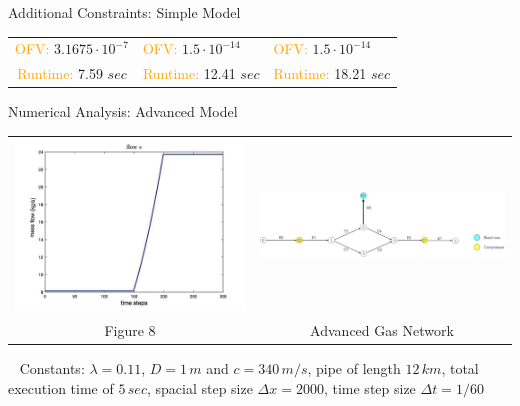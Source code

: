 \documentclass[8pt]{beamer}
\newcommand\Fontli{\fontsize{7}{7.2}\selectfont}
\begin{document}
\begin{frame}{Additional Constraints: Simple Model}
\begin{tabular}{c p{3cm} p{3cm}}
\textcolor{orange}{OFV:} $3.1675 \cdot 10^{-7}$ & \textcolor{orange}{OFV:}  $1.5 \cdot 10^{-14}$  & \textcolor{orange}{OFV:}  $1.5 \cdot 10^{-14}$ \\ 
\textcolor{orange}{Runtime:} 7.59 $sec$ & \textcolor{orange}{Runtime:}  12.41 $sec$  & \textcolor{orange}{Runtime:}  18.21 $sec$ \\
\end{tabular}
\end{frame}

\begin{frame}{Numerical Analysis: Advanced Model}
\Fontli
\begin{tabular}{cc}
  \includegraphics[height=0.4\textheight]{images/eps_advanced_new.jpg}& 
  \includegraphics[height=0.18\textheight]{images/AdvancedNetwork} 
   \\                                                     
\textcolor{bluepurp}{Figure 8} & Advanced Gas Network 
 \end{tabular}
 \ \newline\newline
\textcolor{bluepurp}{Constants:} $\lambda = 0.11$, $D=1 \, m$ and $c = 340 \, m/s$,  pipe of length $12 \, km$,  total execution time of $5 \, sec$, spacial step size  $\Delta x = 2000$,  time step size $\Delta t = 1/60$  \newline\newline

\end{frame}
\end{document}
